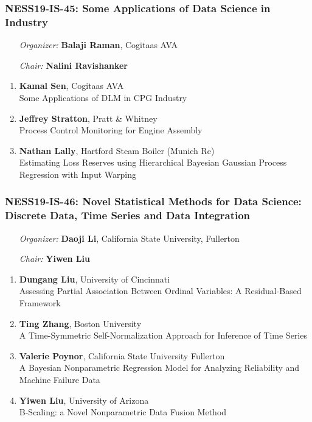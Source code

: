 \subsubsection*{NESS19-IS-45: Some Applications of Data Science in Industry}

\begin{enumerate}[align=left]
\item [\emph{Organizer:}] \textbf{Balaji Raman}, Cogitaas AVA \\
\item [\emph{Chair:}] \textbf{Nalini Ravishanker}
\end{enumerate}

\begin{enumerate}
\item \textbf{Kamal Sen}, Cogitaas AVA \\
Some Applications of DLM in CPG Industry
\item \textbf{Jeffrey Stratton}, Pratt \& Whitney \\
Process Control Monitoring for Engine Assembly
\item \textbf{Nathan Lally}, Hartford Steam Boiler (Munich Re) \\
Estimating Loss Reserves using Hierarchical Bayesian Gaussian Process Regression with Input Warping
\end{enumerate}

\subsubsection*{NESS19-IS-46: Novel Statistical Methods for Data Science: Discrete Data, Time Series and Data Integration}

\begin{enumerate}[align=left]
\item [\emph{Organizer:}] \textbf{Daoji Li}, California State University, Fullerton \\
\item [\emph{Chair:}] \textbf{Yiwen Liu}
\end{enumerate}

\begin{enumerate}
\item \textbf{Dungang Liu}, University of Cincinnati \\
Assessing Partial Association Between Ordinal Variables: A Residual-Based Framework
\item \textbf{Ting Zhang}, Boston University \\
A Time-Symmetric Self-Normalization Approach for Inference of Time Series
\item \textbf{Valerie Poynor}, California State University Fullerton \\
A Bayesian Nonparametric Regression Model for Analyzing Reliability and Machine Failure Data
\item \textbf{Yiwen Liu}, University of Arizona \\
B-Scaling: a Novel Nonparametric Data Fusion Method
\end{enumerate}

